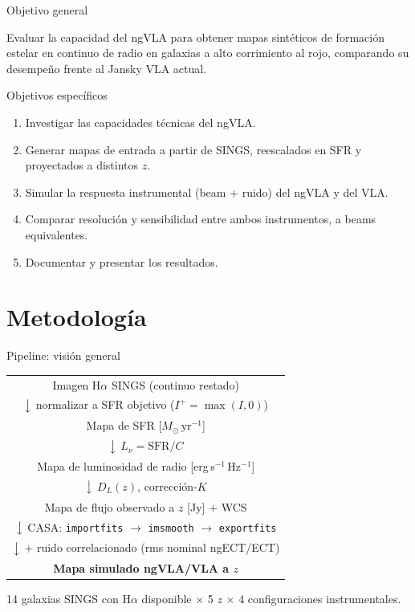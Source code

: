\documentclass[12pt,aspectratio=169]{beamer}
\begin{document}
\begin{frame}{Objetivo general}
    \begin{block}{}
        Evaluar la capacidad del ngVLA para obtener mapas sintéticos de
        formación estelar en continuo de radio en galaxias a alto
        corrimiento al rojo, comparando su desempeño frente al Jansky VLA
        actual.
    \end{block}
    \begin{block}{Objetivos específicos}
        \begin{enumerate}
            \item Investigar las capacidades técnicas del ngVLA.
            \item Generar mapas de entrada a partir de SINGS, reescalados
            en SFR y proyectados a distintos $z$.
            \item Simular la respuesta instrumental (beam + ruido) del
            ngVLA y del VLA.
            \item Comparar resolución y sensibilidad entre ambos
            instrumentos, a beams equivalentes.
            \item Documentar y presentar los resultados.
        \end{enumerate}
    \end{block}
\end{frame}

\section{Metodología}

\begin{frame}{Pipeline: visión general}
    \begin{center}
    \begin{tabular}{c}
    Imagen H$\alpha$ SINGS (continuo restado) \\
    $\big\downarrow$ normalizar a SFR objetivo ($I^+=\max(I,0)$) \\
    Mapa de SFR [$M_\odot\,\mathrm{yr^{-1}}$] \\
    $\big\downarrow$ $L_\nu = \mathrm{SFR}/C$ \\
    Mapa de luminosidad de radio [erg\,s$^{-1}$\,Hz$^{-1}$] \\
    $\big\downarrow$ $D_L(z)$, corrección-$K$ \\
    Mapa de flujo observado a $z$ [Jy] + WCS \\
    $\big\downarrow$ CASA: \texttt{importfits} $\to$ \texttt{imsmooth} $\to$ \texttt{exportfits} \\
    $\big\downarrow$ + ruido correlacionado (rms nominal ngECT/ECT) \\
    \textbf{Mapa simulado ngVLA/VLA a $z$}
    \end{tabular}
    \end{center}
    \vfill
    \small 14 galaxias SINGS con H$\alpha$ disponible $\times$ 5 $z$
    $\times$ 4 configuraciones instrumentales.
\end{frame}
\end{document}
